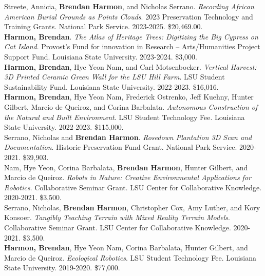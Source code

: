 \documentclass[10pt]{developercv} %
\begin{document}


Streete, Annicia, \textbf{Brendan Harmon}, and Nicholas Serrano.
\emph{Recording African American Burial Grounds as Points Clouds}.
2023 Preservation Technology and Training Grants. 
National Park Service. 
2023-2025. \$20,469.00.\\

\textbf{Harmon, Brendan}.
\emph{The Atlas of Heritage Trees: Digitizing the Big Cypress on Cat Island}.
Provost's Fund for innovation in Research -- Arts/Humanities Project Support Fund. 
Louisiana State University. 
2023-2024. \$3,000.\\

\textbf{Harmon, Brendan}, Hye Yeon Nam, and Carl Motsenbocker.
\emph{Vertical Harvest: 3D Printed Ceramic Green Wall for the LSU Hill Farm}.
LSU Student Sustainability Fund. 
Louisiana State University. 
2022-2023. \$16,016.\\

\textbf{Harmon, Brendan}, Hye Yeon Nam, Frederick Ostrenko, Jeff Kuehny, Hunter Gilbert, Marcio de Queiroz, and Corina Barbalata. 
\emph{Autonomous Construction of the Natural and Built Environment}.
LSU Student Technology Fee. 
Louisiana State University. 
2022-2023. \$115,000.\\

Serrano, Nicholas and \textbf{Brendan Harmon}. 
\emph{Rosedown Plantation 3D Scan and Documentation}. 
Historic Preservation Fund Grant. 
National Park Service. 
2020-2021. \$39,903.\\

Nam, Hye Yeon, Corina Barbalata, \textbf{Brendan Harmon}, Hunter Gilbert, and Marcio de Queiroz.
\emph{Robots in Nature: Creative Environmental Applications for Robotics}.
Collaborative Seminar Grant. 
LSU Center for Collaborative Knowledge.
2020-2021. \$3,500.\\

Serrano, Nicholas, \textbf{Brendan Harmon}, Christopher Cox, Amy Luther, and Kory Konsoer.
\emph{Tangibly Teaching Terrain with Mixed Reality Terrain Models}.
Collaborative Seminar Grant. 
LSU Center for Collaborative Knowledge.
2020-2021. \$3,500.\\

\textbf{Harmon, Brendan}, Hye Yeon Nam, Corina Barbalata, Hunter Gilbert, and Marcio de Queiroz.
\emph{Ecological Robotics}.
LSU Student Technology Fee. 
Louisiana State University. 
2019-2020.	\$77,000.\\
\end{document}
